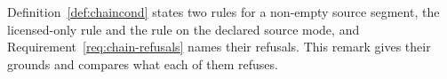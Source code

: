 
Definition~\ref{def:chaincond} states two rules for a non-empty source
segment, the licensed-only rule and the rule on the declared source mode, and
Requirement~\ref{req:chain-refusals} names their refusals. This remark gives
their grounds and compares what each of them refuses.

